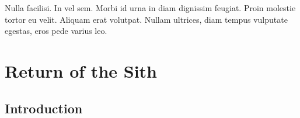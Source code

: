 \graphicspath{{figures/chapter-4/}}


\begin{savequote}[75mm]
Nulla facilisi. In vel sem. Morbi id urna in diam dignissim feugiat. Proin molestie tortor eu velit. Aliquam erat volutpat. Nullam    ultrices, diam tempus vulputate egestas, eros pede varius leo.
\end{savequote}

\chapter{Return of the Sith}


\section{Introduction}

\lipsum[15-19]
\cite{Salmon2006}


